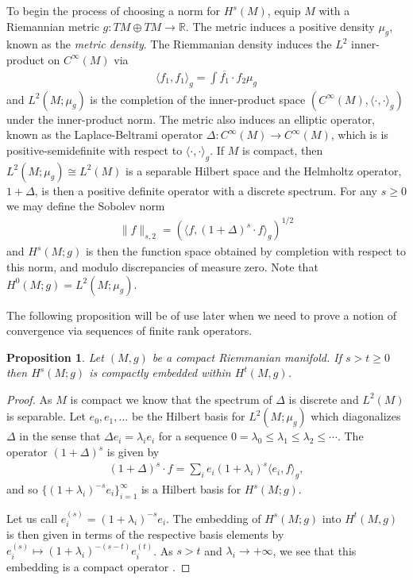 \documentclass[final,leqno]{siamltex1213}
\newtheorem{prop}[thm]{Proposition}
\begin{document}
To begin the process of choosing a norm for $H^{s}(M)$, equip $M$ with a Riemannian metric $g:TM \oplus TM \to \mathbb{R}$.
The metric induces a positive density $\mu_g$,
known as the \emph{metric density}. 
The Riemmanian density induces the $L^2$ inner-product on $C^\infty(M)$ via
\begin{align}
	\langle f_1 , f_1 \rangle_{g} = \int \overline{f_1} \cdot f_2 \mu_g
\end{align}
and $L^{2}(M;\mu_{g})$ is the completion of the inner-product space $( C^{\infty}(M) , \langle \cdot , \cdot \rangle_{g})$ under 
the inner-product norm.
The metric also induces an elliptic operator, known as the Laplace-Beltrami operator $\Delta: C^{\infty}(M) \to C^{\infty}(M)$, which is is positive-semidefinite
with respect to $\langle \cdot , \cdot \rangle_{g}$.
If $M$ is compact, then $L^2(M ; \mu_g) \cong L^2(M)$ is a separable Hilbert space
and the Helmholtz operator, $1 + \Delta$, is then a positive definite operator
with a discrete spectrum.
For any $s \geq 0$ we may define the Sobolev norm
\begin{align}
	\| f \|_{s,2} =  \left( \langle f , (1+\Delta)^s \cdot f \rangle_{g} \right)^{1/2}
\end{align}
and $H^s(M ; g)$ is then the function space obtained by completion with respect to this norm, and modulo discrepancies of measure zero.
Note that $H^0(M;g) = L^2(M;\mu_g)$.

The following proposition will be of use later when we need to prove a notion of convergence
via sequences of finite rank operators.

\begin{prop} \label{prop:compact_embedding}
	Let $(M,g)$ be a compact Riemmanian manifold.  If $s > t \geq 0$ then $H^s(M;g)$ is compactly embedded within $H^t(M,g)$.
\end{prop}
\begin{proof}
	As $M$ is compact we know that the spectrum of $\Delta$ is discrete and $L^{2}(M)$ is separable.
	Let $e_0, e_1,\dots$ be the Hilbert basis for $L^2(M;\mu_g)$ which diagonalizes $\Delta$
	in the sense that $\Delta e_i = \lambda_i e_i$ for a sequence $0 = \lambda_0 \leq \lambda_1 \leq \lambda_2 \leq \cdots$.
	The operator $(1+\Delta)^s$ is given by
	\begin{align}
		(1+\Delta)^s \cdot f =  \sum_{i} e_i (1+\lambda_i)^s \langle e_i , f \rangle_g,
	\end{align}
	and so $\{ (1+ \lambda_i)^{-s} e_i \}_{i=1}^{\infty}$ is a Hilbert basis for $H^s(M;g)$.
	
	Let us call $e_i^{(s)} = (1+ \lambda_i)^{-s} e_i$.
	The embedding of $H^s(M;g)$ into $H^t(M,g)$
	is then given in terms of the respective basis elements by $e_i^{(s)} \mapsto (1+\lambda_i)^{-(s-t)}e_i^{(t)}$.
	As $s > t$ and $\lambda_i \to +\infty$, we see that 
	this embedding is a compact operator \cite[see Proposition 4.6]{Conway1990}.
\end{proof}
\end{document}
